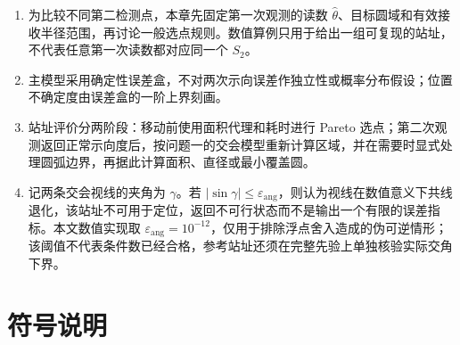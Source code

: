 \begin{enumerate}
\item 为比较不同第二检测点，本章先固定第一次观测的读数 $\hat\theta$、目标圆域和有效接收半径范围，再讨论一般选点规则。数值算例只用于给出一组可复现的站址，不代表任意第一次读数都对应同一个 $S_2$。
\item 主模型采用确定性误差盒，不对两次示向误差作独立性或概率分布假设；位置不确定度由误差盒的一阶上界刻画。
\item 站址评价分两阶段：移动前使用面积代理和耗时进行 Pareto 选点；第二次观测返回正常示向度后，按问题一的交会模型重新计算区域，并在需要时显式处理圆弧边界，再据此计算面积、直径或最小覆盖圆。
\item 记两条交会视线的夹角为 $\gamma$。若 $|\sin\gamma|\le\varepsilon_{\mathrm{ang}}$，则认为视线在数值意义下共线退化，该站址不可用于定位，返回不可行状态而不是输出一个有限的误差指标。本文数值实现取 $\varepsilon_{\mathrm{ang}}=10^{-12}$，仅用于排除浮点舍入造成的伪可逆情形；该阈值不代表条件数已经合格，参考站址还须在完整先验上单独核验实际交角下界。
\end{enumerate}

\section{符号说明}

